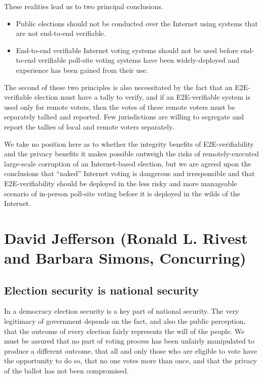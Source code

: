 These realities lead us to two principal conclusions.

\begin{itemize}
\item Public elections should not be conducted over the Internet
using systems that are not end-to-end verifiable.

\item End-to-end verifiable Internet voting systems should not be
used before end-to-end verifiable poll-site voting systems have been
widely-deployed and experience has been gained from their use.
\end{itemize}

The second of these two principles is also necessitated by the fact
that an E2E-verifiable election must have a tally to verify, and if an
E2E-verifiable system is used only for remote voters, then the votes
of these remote voters must be separately tallied and reported.  Few
jurisdictions are willing to segregate and report the tallies of local
and remote voters separately. 

We take no position here as to whether the integrity benefits of
E2E-verifiability and the privacy benefits it makes possible outweigh
the risks of remotely-executed large-scale corruption of an
Internet-based election, but we are agreed upon the conclusions that
“naked” Internet voting is dangerous and irresponsible and that
E2E-verifiability should be deployed in the less risky and more
manageable scenario of in-person poll-site voting before it is
deployed in the wilds of the Internet.

\section{David Jefferson (Ronald L. Rivest and Barbara Simons,
  Concurring)}

\subsection{Election security is national security}

In a democracy election security is a key part of national
security. The very legitimacy of government depends on the fact, and
also the public perception, that the outcome of every election fairly
represents the will of the people. We must be assured that no part of
voting process has been unfairly manipulated to produce a different
outcome, that all and only those who are eligible to vote have the
opportunity to do so, that no one votes more than once, and that the
privacy of the ballot has not been compromised.


